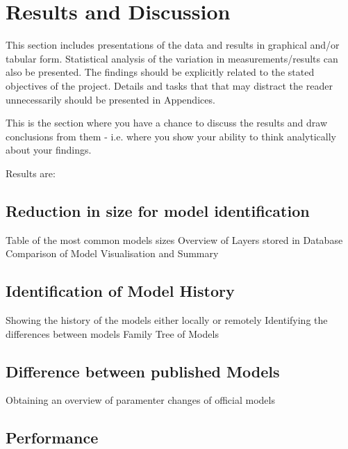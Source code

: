 \section{Results and Discussion}
This section includes presentations of the data and results in graphical and/or tabular form. Statistical analysis of the variation in measurements/results can also be presented. The findings should be explicitly related to the stated objectives of the project. Details and tasks that that may distract the reader unnecessarily should be presented in Appendices.

This is the section where you have a chance to discuss the results and draw conclusions from them - i.e. where you show your ability to think analytically about your findings.

Results are:

\subsection{Reduction in size for model identification}
    Table of the most common models sizes
    Overview of Layers stored in Database
    Comparison of Model Visualisation and Summary

\subsection{Identification of Model History}
    Showing the history of the models either locally or remotely
    Identifying the differences between models
    Family Tree of Models

\subsection{Difference between published Models}
    Obtaining an overview of paramenter changes of official models

\subsection{Performance}




